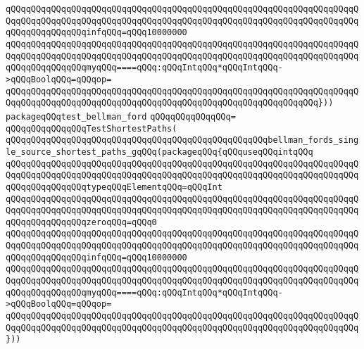 \verb|qQQqqQQqqQQqqQQqqQQqqQQqqQQqqQQqqQQqqQQqqQQqqQQqqQQqqQQqqQQqqQQqqQQqqQQqqQQqqQQqqQQqqQQqqQQqqQQqqQQqqQQqqQQqqQQqqQQqqQQqqQQqqQQqqQQqqQQqqQQqqQQqqQQqqQQqqQQqinfqQQq=qQQq10000000|\newline
\verb|qQQqqQQqqQQqqQQqqQQqqQQqqQQqqQQqqQQqqQQqqQQqqQQqqQQqqQQqqQQqqQQqqQQqqQQqqQQqqQQqqQQqqQQqqQQqqQQqqQQqqQQqqQQqqQQqqQQqqQQqqQQqqQQqqQQqqQQqqQQqqQQqqQQqqQQqqQQqmyqQQq====qQQq:qQQqIntqQQq*qQQqIntqQQq->qQQqBoolqQQq=qQQqop=|\newline
\verb|qQQqqQQqqQQqqQQqqQQqqQQqqQQqqQQqqQQqqQQqqQQqqQQqqQQqqQQqqQQqqQQqqQQqqQQqqQQqqQQqqQQqqQQqqQQqqQQqqQQqqQQqqQQqqQQqqQQqqQQqqQQqqQQqqQQq}))|\newline
\newline
\verb|packageqQQqtest_bellman_ford|\newline
\verb|qQQqqQQqqQQqqQQq=|\newline
\verb|qQQqqQQqqQQqqQQqTestShortestPaths(|\newline
\verb|qQQqqQQqqQQqqQQqqQQqqQQqqQQqqQQqqQQqqQQqqQQqqQQqqQQqbellman_fords_single_source_shortest_paths_gqQQq(packageqQQq{qQQquseqQQqintqQQq|\newline
\verb|qQQqqQQqqQQqqQQqqQQqqQQqqQQqqQQqqQQqqQQqqQQqqQQqqQQqqQQqqQQqqQQqqQQqqQQqqQQqqQQqqQQqqQQqqQQqqQQqqQQqqQQqqQQqqQQqqQQqqQQqqQQqqQQqqQQqqQQqqQQqqQQqqQQqqQQqqQQqtypeqQQqElementqQQq=qQQqInt|\newline
\verb|qQQqqQQqqQQqqQQqqQQqqQQqqQQqqQQqqQQqqQQqqQQqqQQqqQQqqQQqqQQqqQQqqQQqqQQqqQQqqQQqqQQqqQQqqQQqqQQqqQQqqQQqqQQqqQQqqQQqqQQqqQQqqQQqqQQqqQQqqQQqqQQqqQQqqQQqqQQqzeroqQQq=qQQq0|\newline
\verb|qQQqqQQqqQQqqQQqqQQqqQQqqQQqqQQqqQQqqQQqqQQqqQQqqQQqqQQqqQQqqQQqqQQqqQQqqQQqqQQqqQQqqQQqqQQqqQQqqQQqqQQqqQQqqQQqqQQqqQQqqQQqqQQqqQQqqQQqqQQqqQQqqQQqqQQqqQQqinfqQQq=qQQq10000000|\newline
\verb|qQQqqQQqqQQqqQQqqQQqqQQqqQQqqQQqqQQqqQQqqQQqqQQqqQQqqQQqqQQqqQQqqQQqqQQqqQQqqQQqqQQqqQQqqQQqqQQqqQQqqQQqqQQqqQQqqQQqqQQqqQQqqQQqqQQqqQQqqQQqqQQqqQQqqQQqqQQqmyqQQq====qQQq:qQQqIntqQQq*qQQqIntqQQq->qQQqBoolqQQq=qQQqop=|\newline
\verb|qQQqqQQqqQQqqQQqqQQqqQQqqQQqqQQqqQQqqQQqqQQqqQQqqQQqqQQqqQQqqQQqqQQqqQQqqQQqqQQqqQQqqQQqqQQqqQQqqQQqqQQqqQQqqQQqqQQqqQQqqQQqqQQqqQQqqQQqqQQq}))|\newline


